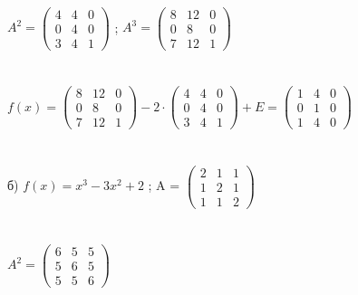 \documentclass[12pt, a4paper]{article}
\begin{document}
	\\\\\\
	\begin{math}
		A^2 = 
		\left(
		\begin{array}{rrr}
			4  & 4 & 0\\
			0 & 4 & 0\\
			3 & 4 & 1
		\end{array}
		\right )
	\end{math}
	; 
	\begin{math}
		A^3 = 
		\left(
		\begin{array}{rrr}
			8  & 12 & 0\\
			0 & 8 & 0\\
			7 & 12 & 1
		\end{array}
		\right )
	\end{math}
	\\\\\\
	$f(x) = 
		\left(
		\begin{array}{rrr}
			8  & 12 & 0\\
			0 & 8 & 0\\
			7 & 12 & 1
		\end{array}
		\right )
	 - 2 \cdot
	 	\left(
	 	\begin{array}{rrr}
	 		4  & 4 & 0\\
	 		0 & 4 & 0\\
	 		3 & 4 & 1
	 	\end{array}
	 	\right )
	  + E = 
	  \left (
	  \begin{array}{rrr}
	  	1  & 4 & 0\\
	  	0 & 1 & 0\\
	  	1&  4 & 0
	  \end{array}
	  \right )
	  $
	  \\\\\\
	  б) $f(x) = x^3 - 3x^2 + 2$
	  ; A = 
	  \begin{math}
	  	\left(
	  	\begin{array}{rrr}
	  		2  & 1 & 1\\
	  		1 &  2 & 1\\
	  		1 & 1 & 2
	  	\end{array}
	  	\right )
	  \end{math}
	  \\\\\\
	  \begin{math}
	  	A^2 = 
	  	\left(
	  	\begin{array}{rrr}
	  		6  & 5 & 5\\
	  		5 & 6 & 5\\
	  		5 & 5 & 6
	  	\end{array}
	  	\right )
	  \end{math}
\end{document}

